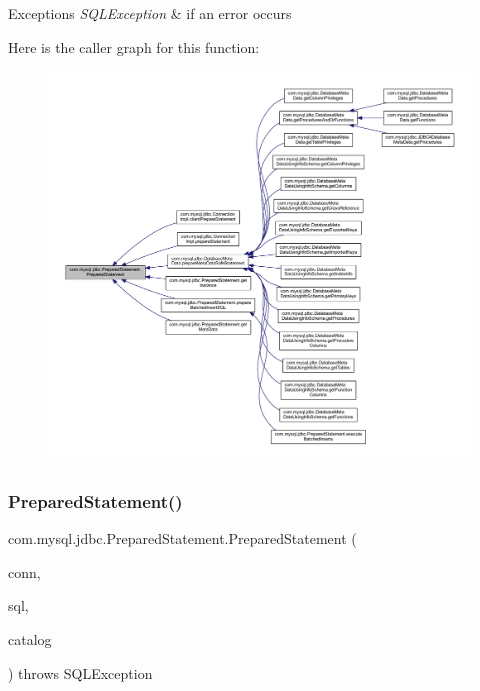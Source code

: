 \begin{DoxyExceptions}{Exceptions}
{\em S\+Q\+L\+Exception} & if an error occurs \\
\hline
\end{DoxyExceptions}
Here is the caller graph for this function\+:
\nopagebreak
\begin{figure}[H]
\begin{center}
\leavevmode
\includegraphics[width=350pt]{classcom_1_1mysql_1_1jdbc_1_1_prepared_statement_af1784431accedc207e4dc40ff2f7f9e5_icgraph}
\end{center}
\end{figure}
\mbox{\label{classcom_1_1mysql_1_1jdbc_1_1_prepared_statement_ad3d4c96994b71d52559d3d084ada8276}} 
\subsubsection{\texorpdfstring{Prepared\+Statement()}{PreparedStatement()}\hspace{0.1cm}{\footnotesize\ttfamily [2/3]}}
{\footnotesize\ttfamily com.\+mysql.\+jdbc.\+Prepared\+Statement.\+Prepared\+Statement (\begin{DoxyParamCaption}\item[{\mbox{\hyperlink{interfacecom_1_1mysql_1_1jdbc_1_1_my_s_q_l_connection}{My\+S\+Q\+L\+Connection}}}]{conn,  }\item[{String}]{sql,  }\item[{String}]{catalog }\end{DoxyParamCaption}) throws S\+Q\+L\+Exception}


